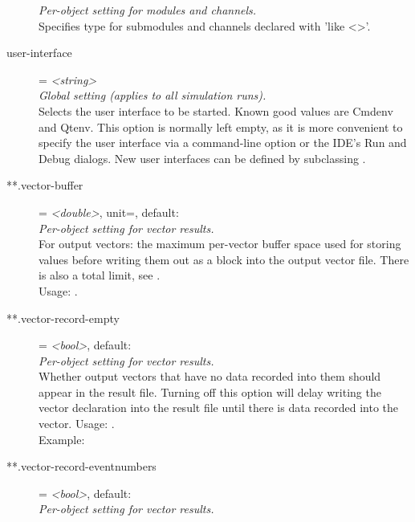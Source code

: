 \begin{description}
    \textit{Per-object setting for modules and channels.}\\
    Specifies type for submodules and channels declared with 'like <>'.
\item[user-interface] = \textit{<string>}\\
    \textit{Global setting (applies to all simulation runs).}\\
    Selects the user interface to be started. Known good values are Cmdenv and
    Qtenv. This option is normally left empty, as it is more convenient to
    specify the user interface via a command-line option or the IDE's Run and
    Debug dialogs. New user interfaces can be defined by subclassing
    .
\item[**.vector-buffer] = \textit{<double>}, unit=, default: \\
    \textit{Per-object setting for vector results.}\\
    For output vectors: the maximum per-vector buffer space used for storing
    values before writing them out as a block into the output vector file.
    There is also a total limit, see
    .\\
    Usage:
    .
\item[**.vector-record-empty] = \textit{<bool>}, default: \\
    \textit{Per-object setting for vector results.}\\
    Whether output vectors that have no data recorded into them should appear
    in the result file. Turning off this option will delay writing the vector
    declaration into the result file until there is data recorded into the
    vector. Usage:
    .\\
    Example:
\item[**.vector-record-eventnumbers] = \textit{<bool>}, default: \\
    \textit{Per-object setting for vector results.}\\

\end{description}
